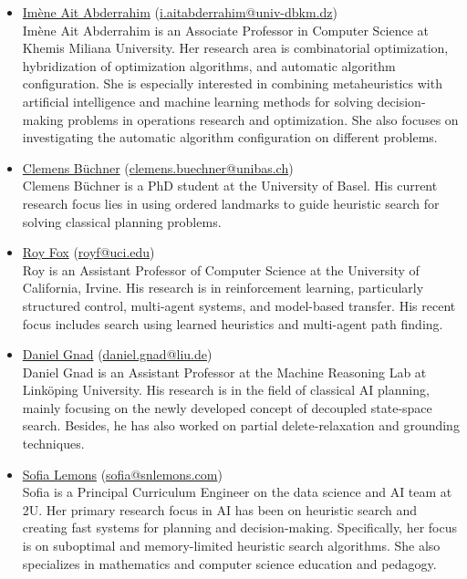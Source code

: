 \documentclass[10pt]{article}
\begin{document}
\newcommand{\organizer}[4]{\href{#2}{#1} (\href{mailto:#3}{#3})\\{#4}}
\begin{itemize}

\item \organizer{Im\`ene Ait Abderrahim}{https://scholar.google.com/citations?user=5y1UwfsAAAAJ&hl=de\&authuser=1}{i.aitabderrahim@univ-dbkm.dz}
Im\`ene Ait Abderrahim is an Associate Professor in Computer Science at Khemis Miliana University. Her research area is combinatorial optimization, hybridization of optimization algorithms, and automatic algorithm configuration. She is especially interested in combining metaheuristics with artificial intelligence and machine learning methods for solving decision-making problems in operations research and optimization. She also focuses on investigating the automatic algorithm configuration on different problems.

\item \organizer{Clemens B\"uchner}{https://ai.dmi.unibas.ch/people/buechner/}{clemens.buechner@unibas.ch}
Clemens B\"uchner is a PhD student at the University of Basel. His current
research focus lies in using ordered landmarks to guide heuristic search for
solving classical planning problems.

\item \organizer{Roy Fox}{https://royf.org}{royf@uci.edu}
Roy is an Assistant Professor of Computer Science at the University of California, Irvine.
His research is in reinforcement learning, particularly structured control, multi-agent systems, and model-based transfer.
His recent focus includes search using learned heuristics and multi-agent path finding.

\item \organizer{Daniel Gnad}{http://mrlab.ai/daniel-gnad/}{daniel.gnad@liu.de}
Daniel Gnad is an Assistant Professor at the Machine Reasoning Lab at
Link\"oping University. His research is in the field of classical AI planning,
mainly focusing on the newly developed concept of decoupled state-space search.
Besides, he has also worked on partial delete-relaxation and grounding
techniques.

\item \organizer{Sofia Lemons}{https://www.linkedin.com/in/sofialemons/}{sofia@snlemons.com}
Sofia is a Principal Curriculum Engineer on the data science and AI
team at 2U. Her primary research focus in AI has been on heuristic
search and creating fast systems for planning and
decision-making. Specifically, her focus is on suboptimal and
memory-limited heuristic search algorithms. She also specializes in
mathematics and computer science education and pedagogy.




\end{itemize}
\end{document}
